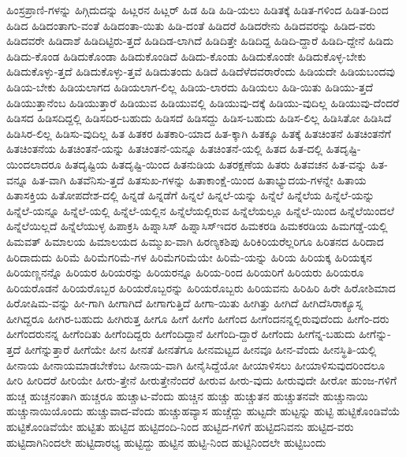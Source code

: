 {ಹಿಂಸ್ರಪ್ರಾಣಿ-ಗಳನ್ನು
ಹಿಗ್ಗಿದುದನ್ನು
ಹಿಟ್ಲರನ
ಹಿಟ್ಲರ್
ಹಿಡ
ಹಿಡಿ
ಹಿಡಿ-ಯಲು
ಹಿಡಿತಕ್ಕೆ
ಹಿಡಿತ-ಗಳಿಂದ
ಹಿಡಿತ-ದಿಂದ
ಹಿಡಿದ
ಹಿಡಿದಂತಾಗು-ವಂತೆ
ಹಿಡಿದಂತಾ-ಯಿತು
ಹಿಡಿ-ದಂತೆ
ಹಿಡಿದರೆ
ಹಿಡಿದರೇನು
ಹಿಡಿದವರನ್ನು
ಹಿಡಿದ-ವರು
ಹಿಡಿದವರೇ
ಹಿಡಿದಾಶೆ
ಹಿಡಿದಿಟ್ಟಿರು-ತ್ತದೆ
ಹಿಡಿದಿಡ-ಲಾಗಿದೆ
ಹಿಡಿದಿತ್ತೇ
ಹಿಡಿದಿದ್ದ
ಹಿಡಿದಿ-ದ್ದಾರೆ
ಹಿಡಿದಿ-ದ್ದೇನೆ
ಹಿಡಿದು
ಹಿಡಿದು-ಕೊಂಡ
ಹಿಡಿದುಕೊಂಡಾ
ಹಿಡಿದುಕೊಂಡಿದೆ
ಹಿಡಿದು-ಕೊಂಡು
ಹಿಡಿದುಕೊಂಡೇ
ಹಿಡಿದುಕೊಳ್ಳ-ಬೇಕು
ಹಿಡಿದುಕೊಳ್ಳು-ತ್ತದೆ
ಹಿಡಿದುಕೊಳ್ಳು-ತ್ತವೆ
ಹಿಡಿದುತಂದು
ಹಿಡಿದೆ
ಹಿಡಿದೆಳೆದವರಾರೆಂದು
ಹಿಡಿಯದೇ
ಹಿಡಿಯಬಂದವು
ಹಿಡಿಯ-ಬೇಕು
ಹಿಡಿಯಲಾಗದ
ಹಿಡಿಯಲಾಗ-ಲಿಲ್ಲ
ಹಿಡಿಯ-ಲಾರದು
ಹಿಡಿಯಲು
ಹಿಡಿ-ಯಿತು
ಹಿಡಿಯು-ತ್ತದೆ
ಹಿಡಿಯುತ್ತಾನೆಂಬ
ಹಿಡಿಯುತ್ತಾರೆ
ಹಿಡಿಯುವ
ಹಿಡಿಯುವಲ್ಲಿ
ಹಿಡಿಯುವು-ದಕ್ಕೆ
ಹಿಡಿಯು-ವುದಿಲ್ಲ
ಹಿಡಿಯುವು-ದೆಂದರೆ
ಹಿಡಿಸದ
ಹಿಡಿಸದಿದ್ದಲ್ಲಿ
ಹಿಡಿಸದಿರ-ಬಹುದು
ಹಿಡಿಸದೆ
ಹಿಡಿಸದ್ದು
ಹಿಡಿಸ-ಬಹುದು
ಹಿಡಿಸ-ಲಿಲ್ಲ
ಹಿಡಿಸಿತೋ
ಹಿಡಿಸಿದೆ
ಹಿಡಿಸಿರ-ಲಿಲ್ಲ
ಹಿಡಿಸು-ವುದಿಲ್ಲ
ಹಿತ
ಹಿತಕರ
ಹಿತಕಾರಿ-ಯಾದ
ಹಿತ-ಕ್ಕಾಗಿ
ಹಿತಕ್ಕೂ
ಹಿತಕ್ಕೆ
ಹಿತಚಿಂತನೆ
ಹಿತಚಿಂತನೆಗೆ
ಹಿತಚಿಂತನೆಯ
ಹಿತಚಿಂತನೆ-ಯನ್ನು
ಹಿತಚಿಂತನೆ-ಯನ್ನೂ
ಹಿತಚಿಂತನೆ-ಯಲ್ಲಿ
ಹಿತದ
ಹಿತ-ದಲ್ಲಿ
ಹಿತದೃಷ್ಟಿ-ಯಿಂದಲಾದರೂ
ಹಿತದೃಷ್ಟಿಯ
ಹಿತದೃಷ್ಟಿ-ಯಿಂದ
ಹಿತನುಡಿಯ
ಹಿತರಕ್ಷಣೆಯ
ಹಿತರು
ಹಿತವಚನ
ಹಿತ-ವನ್ನು
ಹಿತ-ವನ್ನೂ
ಹಿತ-ವಾಗಿ
ಹಿತವೆನಿಸು-ತ್ತದೆ
ಹಿತಸುಖ-ಗಳನ್ನು
ಹಿತಾಕಾಂಕ್ಷೆ-ಯಿಂದ
ಹಿತಾಭ್ಯುದಯ-ಗಳನ್ನೇ
ಹಿತಾಯ
ಹಿತಾಸಕ್ತಿಯ
ಹಿತೋಪದೇಶ-ದಲ್ಲಿ
ಹಿನ್ನಡೆ
ಹಿನ್ನಡೆಗೆ
ಹಿನ್ನಲೆ
ಹಿನ್ನಲೆ-ಯನ್ನು
ಹಿನ್ನೆಲೆ
ಹಿನ್ನೆಲೆಯ
ಹಿನ್ನೆಲೆ-ಯನ್ನು
ಹಿನ್ನೆಲೆ-ಯನ್ನೂ
ಹಿನ್ನೆಲೆ-ಯಲ್ಲಿ
ಹಿನ್ನೆಲೆ-ಯಲ್ಲಿನ
ಹಿನ್ನೆಲೆಯಲ್ಲಿರುವ
ಹಿನ್ನೆಲೆಯಲ್ಲೂ
ಹಿನ್ನೆಲೆ-ಯಿಂದ
ಹಿನ್ನೆಲೆಯಿಂದಲೆ
ಹಿನ್ನೆಲೆಯಿಲ್ಲದೆ
ಹಿನ್ನೆಲೆಯುಳ್ಳ
ಹಿಪಾಕ್ರಸಿ
ಹಿಪ್ನಾಸಿಸ್
ಹಿಪ್ನಾಸಿಸ್ಇದರ
ಹಿಮಕರಡಿ
ಹಿಮಕರಡಿಯ
ಹಿಮಗಡ್ಡೆ-ಯಲ್ಲಿ
ಹಿಮವತ್
ಹಿಮಾಲಯ
ಹಿಮಾಲಯದ
ಹಿಮ್ಮುಖ-ವಾಗಿ
ಹಿರಣ್ಯಕಶಿಪು
ಹಿರಿಕಿರಿಯರೆಲ್ಲರಿಗೂ
ಹಿರಿತನದ
ಹಿರಿದಾದ
ಹಿರಿದಾದುದು
ಹಿರಿಮೆ
ಹಿರಿಮೆಗರಿಮೆ-ಗಳ
ಹಿರಿಮೆಗರಿಮೆಯೇ
ಹಿರಿಮೆ-ಯನ್ನು
ಹಿರಿಯ
ಹಿರಿಯಕ್ಕ
ಹಿರಿಯಕ್ಕನ
ಹಿರಿಯಣ್ಣನನ್ನೊ
ಹಿರಿಯರ
ಹಿರಿಯರನ್ನು
ಹಿರಿಯರನ್ನೂ
ಹಿರಿಯ-ರಿಂದ
ಹಿರಿಯರಿಗೆ
ಹಿರಿಯರು
ಹಿರಿಯರೂ
ಹಿರಿಯರೊಡನೆ
ಹಿರಿಯರೊಬ್ಬರ
ಹಿರಿಯರೊಬ್ಬರನ್ನು
ಹಿರಿಯರೊಬ್ಬರು
ಹಿರಿಯವನು
ಹಿರಿಹಿರಿ
ಹಿರೇ
ಹಿರೋಶಿಮಾದ
ಹಿರೋಷಿಮ-ವನ್ನು
ಹೀ-ಗಾಗಿ
ಹೀಗಾಗಿದೆ
ಹೀಗಾಗುತ್ತಿದೆ
ಹೀಗಾ-ಯಿತು
ಹೀಗಿತ್ತು
ಹೀಗಿದೆ
ಹೀಗಿದೆಸಿರಾಕ್ಯೂಸ್ನ
ಹೀಗಿದ್ದರೂ
ಹೀಗಿರ-ಬಹುದು
ಹೀಗಿರುತ್ತ
ಹೀಗೂ
ಹೀಗೆ
ಹೀಗೆಂ
ಹೀಗೆಂದ
ಹೀಗೆಂದನನ್ನಲ್ಲಿರುವುದೆಂದು
ಹೀಗೆಂ-ದರು
ಹೀಗೆಂದರುನನ್ನ
ಹೀಗೆಂದಿತು
ಹೀಗೆಂದಿದ್ದರು
ಹೀಗೆಂದಿದ್ದಾನೆ
ಹೀಗೆಂದಿ-ದ್ದಾರೆ
ಹೀಗೆಂದು
ಹೀಗೆನ್ನ-ಬಹುದು
ಹೀಗೆನ್ನು-ತ್ತದೆ
ಹೀಗೆನ್ನುತ್ತಾರೆ
ಹೀಗೆಯೇ
ಹೀನ
ಹೀನತೆ
ಹೀನತೆಗೂ
ಹೀನಮಟ್ಟದ
ಹೀನವೂ
ಹೀನ-ವೆಂದು
ಹೀನಸ್ಥಿತಿ-ಯಲ್ಲಿ
ಹೀನಾಯ
ಹೀನಾಯಮಾಡಬೇಕೆಂಬ
ಹೀನಾಯ-ವಾಗಿ
ಹೀನೈಸಿದ್ದೆಯೋ
ಹೀಯಾಳಿಸಲು
ಹೀಯಾಳಿಸುವುದರಿಂದಲೂ
ಹೀರಿ
ಹೀರಿದರೆ
ಹೀರಿಯೇ
ಹೀರು-ತ್ತೇನೆ
ಹೀರುತ್ತೇನೆಂದರೆ
ಹೀರುವ
ಹೀರು-ವುದು
ಹೀರುವುದೇ
ಹೀರೋ
ಹುಂಜ-ಗಳಿಗೆ
ಹುಚ್ಚ
ಹುಚ್ಚನಂತಾಗಿ
ಹುಚ್ಚರೂ
ಹುಚ್ಚಾಟ-ವೆಂದು
ಹುಚ್ಚಿನ
ಹುಚ್ಚು
ಹುಚ್ಚುತನ
ಹುಚ್ಚುತನವೇ
ಹುಚ್ಚುನಾಯಿ
ಹುಚ್ಚುನಾಯಿಯೊಂದು
ಹುಚ್ಚುವಾದ-ವೆಂದು
ಹುಚ್ಚುಹವ್ಯಾಸ
ಹುಚ್ಚೆದ್ದು
ಹುಟ್ಟದೇ
ಹುಟ್ಟನ್ನು
ಹುಟ್ಟಿ
ಹುಟ್ಟಿಕೊಂಡಿವೆಯೆ
ಹುಟ್ಟಿಕೊಂಡಿವೆಯೇ
ಹುಟ್ಟಿತು
ಹುಟ್ಟಿದ
ಹುಟ್ಟಿದಂದಿ-ನಿಂದ
ಹುಟ್ಟಿದ-ಗಳಿಗೆ
ಹುಟ್ಟಿದನಿವನು
ಹುಟ್ಟಿದ-ವರು
ಹುಟ್ಟಿದಾಗಿನಿಂದಲೇ
ಹುಟ್ಟಿದಾರಭ್ಯ
ಹುಟ್ಟಿದ್ದು
ಹುಟ್ಟಿನ
ಹುಟ್ಟಿ-ನಿಂದ
ಹುಟ್ಟಿನಿಂದಲೇ
ಹುಟ್ಟಿಬಂದು
}
